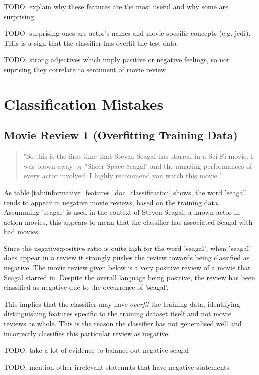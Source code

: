 \documentclass{article}
\begin{document}
TODO: explain why these features are the most useful and why some are surprising

TODO: surprising ones are actor's names and movie-specific concepts (e.g. jedi). THis is a sign that the classifier has overfit the test data

TODO: strong adjectives which imply positive or negative feelings, so not suprising they correlate to sentiment of movie review

\section {Classification Mistakes}

\subsection{Movie Review 1 (Overfitting Training Data)}

\begin{quote}
"So this is the first time that Steven Seagal has starred in a Sci-Fi movie. I was blown away by "Sheer Space Seagal" and the amazing performances of every actor involved. I highly recommend you watch this movie."
\end{quote}

As table \ref{tab:informative_features_doc_classification} shows, the word 'seagal' tends to appear in negative movie reviews, based on the training data. Assumming 'seagal' is used in the context of Steven Seagal, a known actor in action movies, this appears to mean that the classifier has associated Seagal with bad movies.

Since the negative:positive ratio is quite high for the word 'seagal', when 'seagal' does appear in a review it strongly pushes the review towards being classified as negative. The movie review given below is a very positive review of a movie that Seagal starred in. Despite the overall language being positive, the review has been classified as negative due to the occurrence of 'seagal'.

This implies that the classifier may have \textit{overfit} the training data, identifying distinguishing features specific to the training dataset itself and not movie reviews as whole. This is the reason the classifier has not generalised well and incorrectly classifies this particular review as negative.

TODO: take a lot of evidence to balance out negative seagal

TODO: mention other irrelevant statemnts that have negative statements
\end{document}
